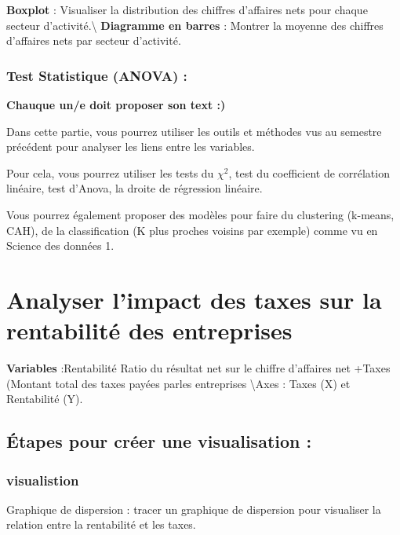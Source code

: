 \documentclass[mstat,12pt]{unswthesis}
\begin{document}
\textbf{Boxplot} : Visualiser la distribution des chiffres d'affaires
nets pour chaque secteur d'activité.\textbackslash{} \textbf{Diagramme
en barres} : Montrer la moyenne des chiffres d'affaires nets par secteur
d'activité.

\subsubsection{Test Statistique (ANOVA)
:}\label{test-statistique-anova-1}

\textbf{Chauque un/e doit proposer son text :) }

Dans cette partie, vous pourrez utiliser les outils et méthodes vus au
semestre précédent pour analyser les liens entre les variables.

Pour cela, vous pourrez utiliser les tests du \(\chi^2\), test du
coefficient de corrélation linéaire, test d'Anova, la droite de
régression linéaire.

Vous pourrez également proposer des modèles pour faire du clustering
(k-means, CAH), de la classification (K plus proches voisins par
exemple) comme vu en Science des données 1.

\section{\texorpdfstring{\textbf{Analyser l'impact des taxes sur la
rentabilité des
entreprises}}{Analyser l'impact des taxes sur la rentabilité des entreprises}}\label{analyser-limpact-des-taxes-sur-la-rentabilituxe9-des-entreprises}

\bigskip

\textbf{Variables} :Rentabilité Ratio du résultat net sur le chiffre
d'affaires net +Taxes (Montant total des taxes payées parles entreprises
\textbackslash Axes : Taxes (X) et Rentabilité (Y).

\subsection{Étapes pour créer une visualisation
:}\label{uxe9tapes-pour-cruxe9er-une-visualisation-5}

\subsubsection{visualistion}\label{visualistion}

Graphique de dispersion : tracer un graphique de dispersion pour
visualiser la relation entre la rentabilité et les taxes.
\end{document}
